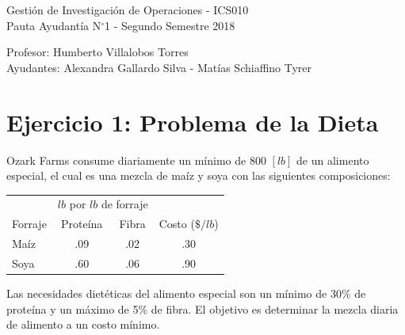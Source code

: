 \documentclass[letterpaper,11pt,oneside]{article}
\newcommand{\grad}{$^{\circ}$}
\begin{document}
	\begin{center}
		{\Large Gestión de Investigación de Operaciones - ICS010}\\
		{\large Pauta Ayudantía N\grad 1 - Segundo Semestre 2018}
	\end{center}

	\begin{center}
		Profesor: Humberto Villalobos Torres\\
		Ayudantes: Alexandra Gallardo Silva - Matías Schiaffino Tyrer
	\end{center}

\section*{Ejercicio 1: Problema de la Dieta}

Ozark Farms consume diariamente un mínimo de 800 $[lb]$ de un alimento especial, el cual es una mezcla de maíz y soya con las siguientes composiciones:

\begin{table}[htb]
	\centering
	\begin{tabular}{l c c c}
		\hline\hline
		& \multicolumn{2}{c}{$lb$ por $lb$ de forraje} & \\
		\cline{2-3}
		Forraje & Proteína & Fibra & Costo ($\$/lb$)\\
		\hline
		Maíz & .09 & .02 & .30\\
		Soya & .60 & .06 & .90\\
		\hline\hline
	\end{tabular}
\end{table}

Las necesidades dietéticas del alimento especial son un mínimo de 30\% de proteína y un máximo de 5\% de fibra. El objetivo es determinar la mezcla diaria de alimento a un costo mínimo.
\end{document}
